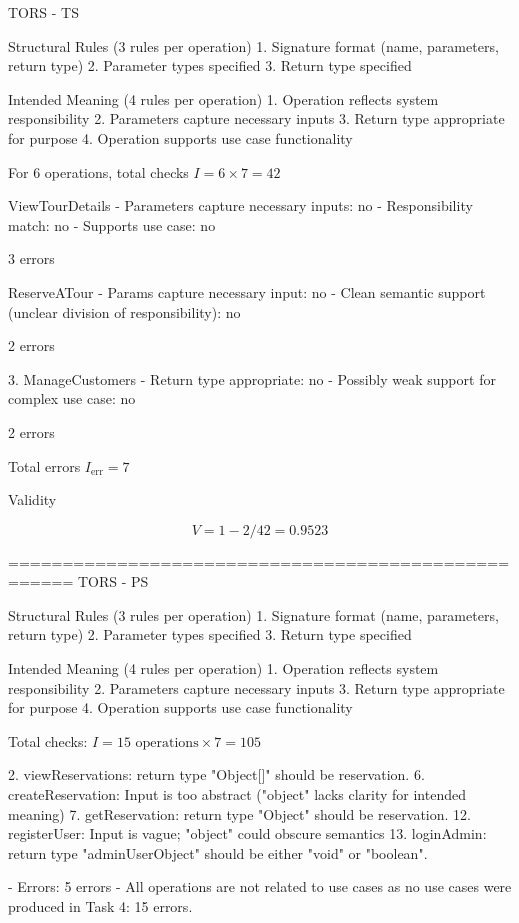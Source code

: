 TORS - TS

Structural Rules (3 rules per operation)
1. Signature format (name, parameters, return type)
2. Parameter types specified
3. Return type specified

Intended Meaning (4 rules per operation)
1. Operation reflects system responsibility
2. Parameters capture necessary inputs
3. Return type appropriate for purpose
4. Operation supports use case functionality

For 6 operations, total checks \( I = 6 \times 7 = 42 \)

ViewTourDetails
- Parameters capture necessary inputs: no  
- Responsibility match: no  
- Supports use case: no

3 errors

ReserveATour
- Params capture necessary input: no  
- Clean semantic support (unclear division of responsibility): no

2 errors

3. ManageCustomers
- Return type appropriate: no
- Possibly weak support for complex use case: no

2 errors

Total errors \( I_{\text{err}} = 7 \)

Validity

\[
V = 1 - 2/42 = 0.9523
\]

====================================================
TORS - PS

Structural Rules (3 rules per operation)
1. Signature format (name, parameters, return type)
2. Parameter types specified
3. Return type specified

Intended Meaning (4 rules per operation)
1. Operation reflects system responsibility
2. Parameters capture necessary inputs
3. Return type appropriate for purpose
4. Operation supports use case functionality

Total checks:  
\( I = 15 \text{ operations} \times 7 = 105 \)

2. viewReservations: return type "Object[]" should be reservation. 
6. createReservation: Input is too abstract ("object" lacks clarity for intended meaning) 
7. getReservation: return type "Object" should be reservation.
12. registerUser:  Input is vague; "object" could obscure semantics    
13. loginAdmin: return type "adminUserObject" should be either "void" or "boolean".
 
- Errors: 5 errors
- All operations are not related to use cases as no use cases were produced in Task 4: 15 errors.

